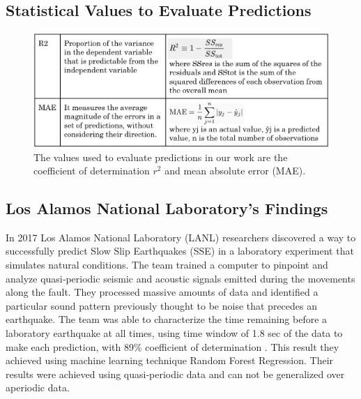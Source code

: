\documentclass[]{llncs} %
\begin{document}
\subsection{Statistical Values to Evaluate Predictions}
\begin{figure}
	\centering
	\includegraphics[width=.9\linewidth]{background}
	\caption{The values used to evaluate predictions in our work are the coefficient of determination $r^2$ and mean absolute error (MAE).}
	\label{fig:background}
\end{figure}

\subsection{Los Alamos National Laboratory's Findings}
In 2017 Los Alamos National Laboratory (LANL) researchers discovered a way to successfully predict Slow Slip Earthquakes (SSE) in a laboratory experiment that simulates natural conditions. The team trained a computer to pinpoint and analyze quasi‐periodic seismic and acoustic signals emitted during the movements along the fault. They processed massive amounts of data and identified a particular sound pattern previously thought to be noise that precedes an earthquake. The team was able to characterize the time remaining before a laboratory earthquake at all times, using time window of 1.8 sec of the data to make each prediction, with 89\% coefficient of determination \cite{LANLNews}. This result they achieved using machine learning technique Random Forest Regression. Their results were achieved using quasi‐periodic data and can not be generalized over aperiodic data. \par
\end{document}
